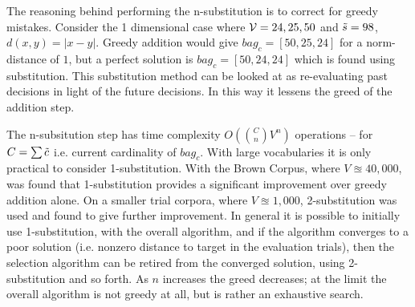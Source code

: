 \documentclass[11pt]{article}
\theoremstyle{plain}
\theoremstyle{definition}
\DeclareMathOperator*{\argmin}{argmin}
\begin{document}
The reasoning behind performing the n-substitution is to correct for greedy mistakes. Consider the 1 dimensional case where $\mathcal{V}={24,25,50}$ and $\tilde{s}=98$, $d(x,y)=\left|x-y\right|$. Greedy addition would give  $bag_c=[50,25,24]$ for a norm-distance of $1$, but a perfect solution  is $bag_c=[50,24,24]$ which is found using  substitution. This substitution method can be looked at as re-evaluating past decisions in light of the future decisions. In this way it lessens the greed of the addition step. 

The n-subsitution step has time complexity $O(\binom{C}{n}V^n)$ operations -- for $C=\sum \tilde{c}$ i.e. current cardinality of $bag_c$. With large vocabularies it is only practical to consider 1-substitution. With the Brown Corpus, where $V\approxeq 40,000$, was found that 1-substitution provides a significant improvement over greedy addition alone. On a smaller trial corpora, where $V\approxeq 1,000$, 2-substitution was used and found to give further improvement. In general it is possible to initially use 1-substitution, with the overall algorithm, and if the algorithm converges to a poor solution (i.e. nonzero distance to target in the evaluation trials), then the selection algorithm can be retired from the converged solution, using 2-substitution and so forth. As $n$ increases the greed decreases; at the limit the overall algorithm is not greedy at all, but is rather an exhaustive search.


\begin{comment}
\begin{algorithm}
	\SetAlgoLined
	\KwData{the metric $d$\\the target sum $\s$\\ the vocabulary of vectors $\V$\\The current best bag of vectors $bag_c$: initially $\emptyset$}
	\KwResult{The $bag_n$  which sum to be at least as close as the input $bag_c$ to the target $\s$, under the metric $d$}
	\Begin{
		
		$\t \longleftarrow \sum\limits_{x_i\in bag_c} x_i$\;
		$bag_n \longleftarrow bag_c$\;
		\ForAll{$\x_i \in bag_c$}{
			$\t^\ast \longleftarrow \t - \x_i$\;
			$bag_c^\ast \longleftarrow bag_c\setminus \{\x_i\}$\;
			
			$\x^\ast \longleftarrow \argmin\limits_{x_j\in \V\cup{\tilde{0}}} d(\s, \t^\ast+\x_j) $\;
			
			\If{$d(\s, \t^\ast+\x^\ast)  < d(\s, \t)$}{
				$t \longleftarrow \t^\ast + \x^\ast$\;
				$bag_n \longleftarrow bag_c^\ast \cup \{\x^\ast\}$\;	
			}
		}
	}
	\Return{$bag_n$}
\caption{1/1-substitution. Note that $\tilde{0}$ is the zero vector, including it with the vocabulary $\V$ is equivalent to considering the option of simply removing the $\x_i$ without replacement.}
\end{algorithm}
\end{comment}
\end{document}
